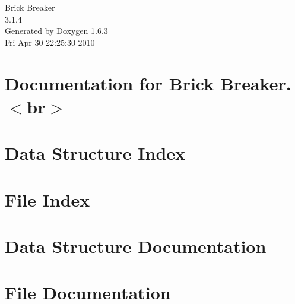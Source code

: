 \documentclass[a4paper]{book}
\begin{document}
\hypersetup{pageanchor=false}
\begin{titlepage}
\vspace*{7cm}
\begin{center}
{\Large Brick Breaker \\[1ex]\large 3.1.4 }\\
\vspace*{1cm}
{\large Generated by Doxygen 1.6.3}\\
\vspace*{0.5cm}
{\small Fri Apr 30 22:25:30 2010}\\
\end{center}
\end{titlepage}
\clearemptydoublepage
{}
\tableofcontents
\clearemptydoublepage
{}
\hypersetup{pageanchor=true}
\chapter{Documentation for Brick Breaker. $<$br$>$}
\label{index}\hypertarget{index}{}
\chapter{Data Structure Index}

\chapter{File Index}

\chapter{Data Structure Documentation}






\chapter{File Documentation}






\printindex
\end{document}

